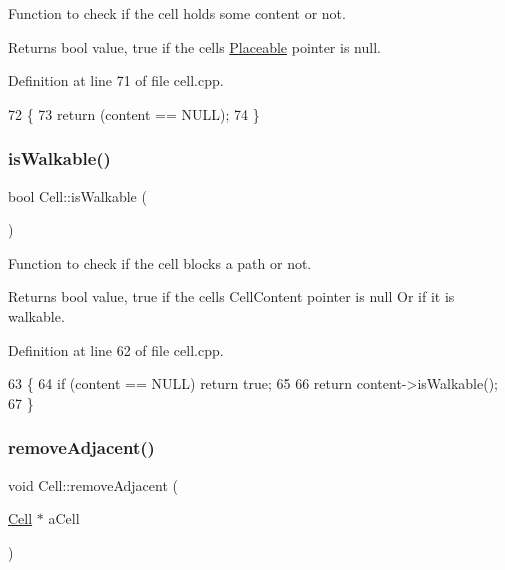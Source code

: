 Function to check if the cell holds some content or not. \begin{DoxyReturn}{Returns}
bool value, true if the cell\textquotesingle{}s \hyperlink{class_placeable}{Placeable} pointer is null. 
\end{DoxyReturn}


Definition at line 71 of file cell.\+cpp.


\begin{DoxyCode}
72 \{
73     \textcolor{keywordflow}{return} (content == NULL);
74 \}
\end{DoxyCode}
\hypertarget{class_cell_af8625542ca100de4cc6e221ea131f05c}{}\label{class_cell_af8625542ca100de4cc6e221ea131f05c} 
\subsubsection{\texorpdfstring{is\+Walkable()}{isWalkable()}}
{\footnotesize\ttfamily bool Cell\+::is\+Walkable (\begin{DoxyParamCaption}{ }\end{DoxyParamCaption})}

Function to check if the cell blocks a path or not. \begin{DoxyReturn}{Returns}
bool value, true if the cell\textquotesingle{}s Cell\+Content pointer is null Or if it is walkable. 
\end{DoxyReturn}


Definition at line 62 of file cell.\+cpp.


\begin{DoxyCode}
63 \{
64     \textcolor{keywordflow}{if} (content == NULL) \textcolor{keywordflow}{return} \textcolor{keyword}{true};
65     
66     \textcolor{keywordflow}{return} content->isWalkable();
67 \}
\end{DoxyCode}
\hypertarget{class_cell_a5d9bda81ac204c982b084c7b02f4d6de}{}\label{class_cell_a5d9bda81ac204c982b084c7b02f4d6de} 
\subsubsection{\texorpdfstring{remove\+Adjacent()}{removeAdjacent()}}
{\footnotesize\ttfamily void Cell\+::remove\+Adjacent (\begin{DoxyParamCaption}\item[{\hyperlink{class_cell}{Cell} $\ast$}]{a\+Cell }\end{DoxyParamCaption})}

